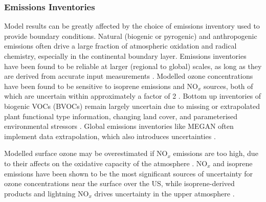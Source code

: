     \subsubsection{Emissions Inventories}
      Model results can be greatly affected by the choice of emissions inventory used to provide boundary conditions.
      Natural (biogenic or pyrogenic) and anthropogenic emissions often drive a large fraction of atmospheric oxidation and radical chemistry, especially in the continental boundary layer.
      Emissions inventories have been found to be reliable at larger (regional to global) scales, as long as they are derived from accurate input measurements \parencite{Zeng2015}.
      Modelled ozone concentrations have been found to be sensitive to isoprene 
      emissions and NO$_x$ sources, both of which are uncertain within 
      approximately a factor of 2 \parencite{Christian2017}.
      Bottom up inventories of biogenic VOCs (BVOCs) remain largely uncertain due to missing or extrapolated plant functional type information, changing land cover, and parameterised environmental stressors \parencite{Guenther2000,Kanakidou2005,Millet2006}.
      Global emissions inventories like MEGAN often implement data extrapolation, which also introduces uncertainties \parencite{Miller2014}.
      
      Modelled surface ozone may be overestimated if NO$_x$ emissions are too high, due to their affects on the oxidative capacity of the atmosphere \parencite{Travis2016}.
      NO$_x$ and isoprene emissions have been shown to be the most significant sources of uncertainty for ozone concentrations near the surface over the US, while isoprene-derived products and lightning NO$_x$ drives uncertainty in the upper atmosphere \parencite{Christian2017}.
      
      
      
